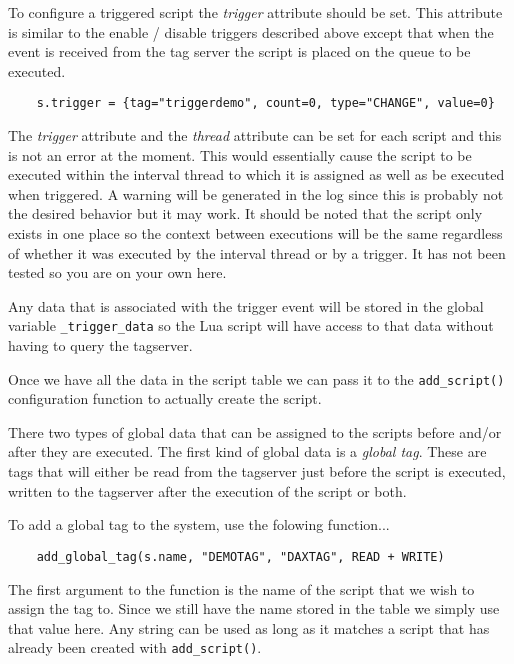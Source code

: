 To configure a triggered script the \textit{trigger} attribute should be set.  This attribute is
similar to the enable / disable triggers described above except that when the event is received
from the tag server the script is placed on the queue to be executed.

\begin{verbatim}
	s.trigger = {tag="triggerdemo", count=0, type="CHANGE", value=0}
\end{verbatim}

The \textit{trigger} attribute and the \textit{thread} attribute can be set for each script and this
is not an error at the moment.  This would essentially cause the script to be executed within
the interval thread to which it is assigned as well as be executed when triggered.  A warning will
be generated in the log since this is probably not the desired behavior but it may work.  It should
be noted that the script only exists in one place so the context between executions will be the
same regardless of whether it was executed by the interval thread or by a trigger.  It has not
been tested so you are on your own here.

Any data that is associated with the trigger event will be stored in the global variable
\texttt{\_trigger\_data} so the Lua script will have access to that data without having to query
the tagserver.

Once we have all the data in the script table we can pass it to the \texttt{add\_script()} configuration
function to actually create the script.

There two types of global data that can be assigned to the scripts before and/or after they are
executed.  The first kind of global data is a \textit{global tag}.  These are \opendax tags that will
either be read from the tagserver just before the script is executed, written to the tagserver
after the execution of the script or both.

To add a global tag to the system, use the folowing function...

\begin{verbatim}
	add_global_tag(s.name, "DEMOTAG", "DAXTAG", READ + WRITE)
\end{verbatim}

The first argument to the function is the name of the script that we wish to assign the tag to.
Since we still have the name stored in the table we simply use that value here.  Any string can
be used as long as it matches a script that has already been created with \texttt{add\_script()}.

